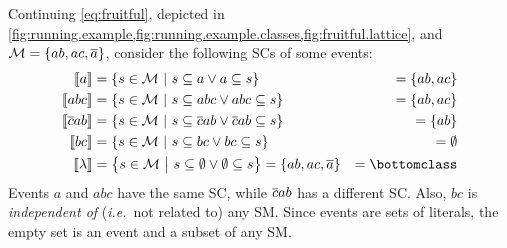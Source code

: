 \documentclass{article}
\begin{document}
Continuing \cref{eq:fruitful}, depicted in
\cref{fig:running.example,fig:running.example.classes,fig:fruitful.lattice},
and \({\cal M} = \set{ab, ac, \ensuremath{\overline{a}}}\), consider the following
\aclp{SC} of some events:
\begin{equation*}
	\begin{aligned}
		\stablecore{a}           & = \set{s \in \MODELset \given s \subseteq a \vee a \subseteq s}                                        & = \set{ab, ac} \\
		\stablecore{abc}         & = \set{s \in \MODELset \given s \subseteq abc \vee abc \subseteq s}                                    & = \set{ab, ac} \\
		\stablecore{\co{c}ab}    & = \set{s \in \MODELset \given s \subseteq \co{c}ab \vee \co{c}ab \subseteq s}                          & = \set{ab}     \\
		\stablecore{bc}          & = \set{s \in \MODELset \given s \subseteq bc \vee bc \subseteq s}                                      & = \emptyset    \\
		\stablecore{\emptyevent} & = \set{s \in \MODELset \given s \subseteq \emptyset \vee \emptyset \subseteq s} = \set{ab, ac, \co{a}} & = \bottomclass \\
	\end{aligned}
\end{equation*}
Events \(a\) and \(abc\) have the same \ac{SC}, while \(\overline{c}ab\) has
a different \ac{SC}.  Also, \(bc\) is \emph{independent of}
(\emph{i.e.}\ not related to) any \acl{SM}.  Since events are sets of
literals, the empty set is an event and a subset of any \ac{SM}.
\end{document}
